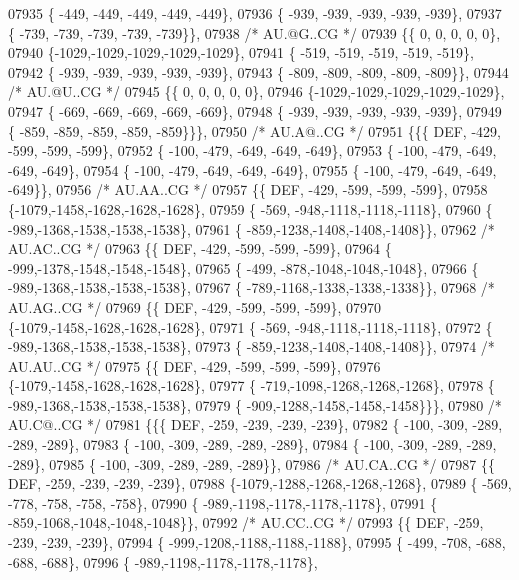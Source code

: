 \begin{DoxyCode}
07935 \{ -449, -449, -449, -449, -449\},
07936 \{ -939, -939, -939, -939, -939\},
07937 \{ -739, -739, -739, -739, -739\}\},
07938 \textcolor{comment}{/* AU.@G..CG */}
07939 \{\{    0,    0,    0,    0,    0\},
07940 \{-1029,-1029,-1029,-1029,-1029\},
07941 \{ -519, -519, -519, -519, -519\},
07942 \{ -939, -939, -939, -939, -939\},
07943 \{ -809, -809, -809, -809, -809\}\},
07944 \textcolor{comment}{/* AU.@U..CG */}
07945 \{\{    0,    0,    0,    0,    0\},
07946 \{-1029,-1029,-1029,-1029,-1029\},
07947 \{ -669, -669, -669, -669, -669\},
07948 \{ -939, -939, -939, -939, -939\},
07949 \{ -859, -859, -859, -859, -859\}\}\},
07950 \textcolor{comment}{/* AU.A@..CG */}
07951 \{\{\{  DEF, -429, -599, -599, -599\},
07952 \{ -100, -479, -649, -649, -649\},
07953 \{ -100, -479, -649, -649, -649\},
07954 \{ -100, -479, -649, -649, -649\},
07955 \{ -100, -479, -649, -649, -649\}\},
07956 \textcolor{comment}{/* AU.AA..CG */}
07957 \{\{  DEF, -429, -599, -599, -599\},
07958 \{-1079,-1458,-1628,-1628,-1628\},
07959 \{ -569, -948,-1118,-1118,-1118\},
07960 \{ -989,-1368,-1538,-1538,-1538\},
07961 \{ -859,-1238,-1408,-1408,-1408\}\},
07962 \textcolor{comment}{/* AU.AC..CG */}
07963 \{\{  DEF, -429, -599, -599, -599\},
07964 \{ -999,-1378,-1548,-1548,-1548\},
07965 \{ -499, -878,-1048,-1048,-1048\},
07966 \{ -989,-1368,-1538,-1538,-1538\},
07967 \{ -789,-1168,-1338,-1338,-1338\}\},
07968 \textcolor{comment}{/* AU.AG..CG */}
07969 \{\{  DEF, -429, -599, -599, -599\},
07970 \{-1079,-1458,-1628,-1628,-1628\},
07971 \{ -569, -948,-1118,-1118,-1118\},
07972 \{ -989,-1368,-1538,-1538,-1538\},
07973 \{ -859,-1238,-1408,-1408,-1408\}\},
07974 \textcolor{comment}{/* AU.AU..CG */}
07975 \{\{  DEF, -429, -599, -599, -599\},
07976 \{-1079,-1458,-1628,-1628,-1628\},
07977 \{ -719,-1098,-1268,-1268,-1268\},
07978 \{ -989,-1368,-1538,-1538,-1538\},
07979 \{ -909,-1288,-1458,-1458,-1458\}\}\},
07980 \textcolor{comment}{/* AU.C@..CG */}
07981 \{\{\{  DEF, -259, -239, -239, -239\},
07982 \{ -100, -309, -289, -289, -289\},
07983 \{ -100, -309, -289, -289, -289\},
07984 \{ -100, -309, -289, -289, -289\},
07985 \{ -100, -309, -289, -289, -289\}\},
07986 \textcolor{comment}{/* AU.CA..CG */}
07987 \{\{  DEF, -259, -239, -239, -239\},
07988 \{-1079,-1288,-1268,-1268,-1268\},
07989 \{ -569, -778, -758, -758, -758\},
07990 \{ -989,-1198,-1178,-1178,-1178\},
07991 \{ -859,-1068,-1048,-1048,-1048\}\},
07992 \textcolor{comment}{/* AU.CC..CG */}
07993 \{\{  DEF, -259, -239, -239, -239\},
07994 \{ -999,-1208,-1188,-1188,-1188\},
07995 \{ -499, -708, -688, -688, -688\},
07996 \{ -989,-1198,-1178,-1178,-1178\},

\end{DoxyCode}
